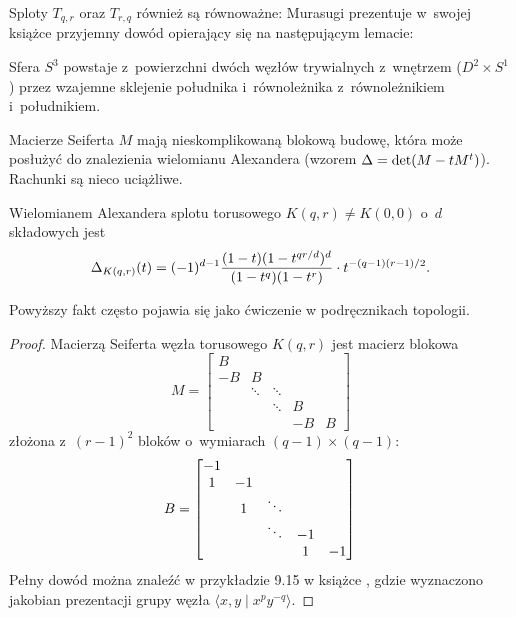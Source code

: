 Sploty $T_{q,r}$ oraz $T_{r,q}$ również są równoważne: Murasugi prezentuje w~swojej książce \cite{murasugi96} przyjemny dowód opierający się na następującym lemacie:

\begin{lemma}
    Sfera $S^3$ powstaje z~powierzchni dwóch węzłów trywialnych z~wnętrzem ($D^2 \times S^1$) przez wzajemne sklejenie południka i~równoleżnika z~równoleżnikiem i~południkiem.
\end{lemma}

Macierze Seiferta $M$ mają nieskomplikowaną blokową budowę, która może posłużyć do znalezienia wielomianu Alexandera (wzorem $\Delta = \det (M - tM^t)$).
Rachunki są nieco uciążliwe.

\begin{proposition}
    Wielomianem Alexandera splotu torusowego $K(q, r) \neq K(0,0)$ o~$d$ składowych jest
    \begin{equation}
        \Delta_{K(q, r)}(t) = (-1)^{d-1} \frac{(1-t)(1 - t^{qr/d})^d}{(1-t^q)(1-t^r)} \cdot t^{-(q-1)(r-1)/2}.
    \end{equation}
\end{proposition}

Powyższy fakt często pojawia się jako ćwiczenie w podręcznikach topologii.

\begin{proof}
    Macierzą Seiferta węzła torusowego $K(q,r)$ jest macierz blokowa
    \begin{equation}
        M = \begin{bmatrix}
            B & & & & \\
            -B & B & & & \\
            & \ddots & \ddots & & \\
            & & \ddots & B & \\
            & & & -B & B
        \end{bmatrix}
    \end{equation}
    złożona z~$(r-1)^2$ bloków o~wymiarach $(q-1) \times (q-1)$:
    \begin{equation}
        B = \begin{bmatrix}
            -1 & & & & \\
            1 & -1 & & & \\
            & 1 & \ddots & & \\
            & & \ddots & -1 & \\
            & & & 1 & -1
        \end{bmatrix} \qedhere
    \end{equation}
    Pełny dowód można znaleźć w przykładzie 9.15 w książce \cite{burde85}, gdzie wyznaczono jakobian prezentacji grupy węzła $\langle x, y \mid x^py^{-q}\rangle$.
\end{proof}

